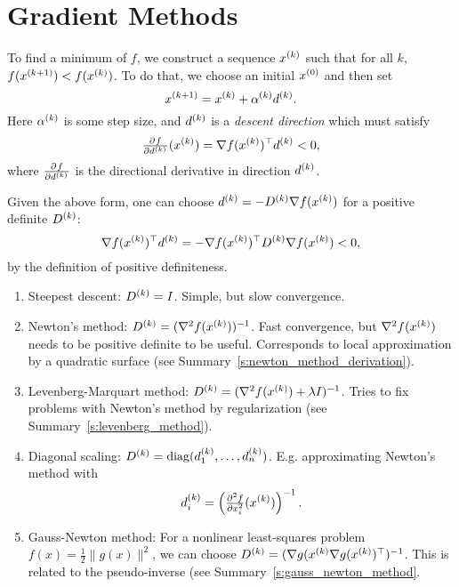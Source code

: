 \documentclass{article}
\begin{document}
\section{Gradient Methods}

\label{s:gradient_methods}

To find a minimum of \(f\), we construct a sequence \(\kth{x}\) such that for all \(k\),
\(f(\kth[k+1]{x}) < f(\kth{x})\).  To do that, we choose an initial \(\kth[0]{x}\) and then set
\begin{equation*}
  \kth[k+1]{x} = \kth{x} + \kth{\alpha} \kth{d}.
\end{equation*}
Here \(\kth{\alpha}\) is some step size, and \(\kth{d}\) is a \emph{descent direction} which must
satisfy
\begin{equation*}
  \pd{f}{{\kth{d}}}(\kth{x}) = \T{\nabla f(\kth{x})} \kth{d} < 0, 
\end{equation*}
where \(\pd{f}{{\kth{d}}}\) is the directional derivative in direction \(\kth{d}\).



Given the above form, one can choose \(\kth{d} = -\kth{D} \nabla f(\kth{x})\) for a positive
definite \(\kth{D}\):
\begin{equation*}
  \T{\nabla f(\kth{x})} \kth{d} = -\T{\nabla f(\kth{x})} \kth{D} \nabla f(\kth{x}) < 0,
\end{equation*}
by the definition of positive definiteness.

\begin{enumerate}
\item Steepest descent: \(\kth{D} = I\). Simple, but slow convergence.
\item Newton's method: \(\kth{D} = (\nabla^2 f(\kth{x}))^{-1}\).  Fast convergence, but
  \(\nabla^2 f(\kth{x})\) needs to be positive definite to be useful.  Corresponds to local
  approximation by a quadratic surface (see Summary~\ref{s:newton_method_derivation}).
\item Levenberg-Marquart method: \(\kth{D} = (\nabla^2 f(\kth{x}) + \lambda I)^{-1}\).  Tries
to fix problems with Newton's method by regularization (see Summary~\ref{s:levenberg_method}).
\item Diagonal scaling: \(\kth{D} = \diag(\kth{d}_1, \ldots, \kth{d}_n)\). E.g. approximating
Newton's method with
\begin{equation*}
  \kth{d}_i = \left( \pd[2]{f}{x_i}(\kth{x}) \right)^{-1}.
\end{equation*}
\item Gauss-Newton method: For a nonlinear least-squares problem
\(f(x) = \frac{1}{2} \lVert g(x) \rVert^2\), we can choose
\(\kth{D} = ( \nabla g(\kth{x} \T{\nabla g(\kth{x})})^{-1}\).  This is related to the
pseudo-inverse (see Summary~\ref{s:gauss_newton_method}.
\end{enumerate}
\end{document}
